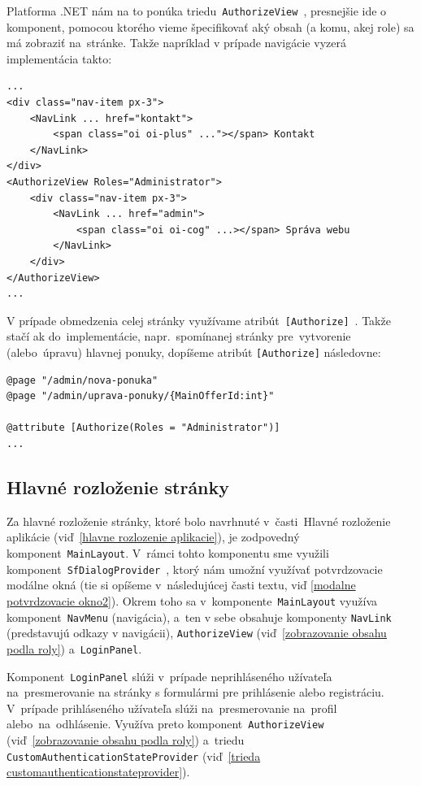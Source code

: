 Platforma .NET nám na to ponúka triedu~\texttt{AuthorizeView}~\cite{authorizeview}, presnejšie ide o komponent, pomocou ktorého vieme špecifikovať aký obsah (a komu, akej role) sa má zobraziť na~stránke. Takže napríklad v prípade navigácie vyzerá implementácia takto:

\begin{verbatim}
...
<div class="nav-item px-3">
    <NavLink ... href="kontakt">
        <span class="oi oi-plus" ..."></span> Kontakt
    </NavLink>
</div>
<AuthorizeView Roles="Administrator">
    <div class="nav-item px-3">
        <NavLink ... href="admin">
            <span class="oi oi-cog" ...></span> Správa webu
        </NavLink>
    </div>
</AuthorizeView>
...
\end{verbatim}

V prípade obmedzenia celej stránky využívame atribút~\texttt{[Authorize]}~\cite{authorize attribute}. Takže stačí ak do~implementácie, napr.~spomínanej stránky pre~vytvorenie (alebo~úpravu) hlavnej ponuky, dopíšeme atribút \verb|[Authorize]| následovne:

\begin{verbatim}
@page "/admin/nova-ponuka"
@page "/admin/uprava-ponuky/{MainOfferId:int}"

@attribute [Authorize(Roles = "Administrator")]
...
\end{verbatim}

\subsection{Hlavné rozloženie stránky}
\label{hlavne rozlozenie stranky}

Za hlavné rozloženie stránky, ktoré bolo navrhnuté v~časti~Hlavné rozloženie aplikácie (viď~\ref{hlavne rozlozenie aplikacie}), je zodpovedný komponent~\verb|MainLayout|. V~rámci tohto komponentu sme využili komponent~\texttt{SfDialogProvider}~\cite{sfdialogprovider}, ktorý nám umožní využívať potvrdzovacie modálne okná (tie si opíšeme v~následujúcej časti textu, viď \ref{modalne potvrdzovacie okno2}). Okrem toho sa v~komponente~\verb|MainLayout| využíva komponent~\verb|NavMenu| (navigácia), a~ten v sebe obsahuje komponenty \verb|NavLink| (predstavujú odkazy v navigácii), \verb|AuthorizeView| (viď~\ref{zobrazovanie obsahu podla roly}) a~\verb|LoginPanel|.

Komponent~\verb|LoginPanel| slúži v~prípade neprihláseného užívateľa na~presmerovanie na stránky s formulármi pre prihlásenie alebo registráciu. V~prípade prihláseného užívateľa slúži na~presmerovanie na~profil alebo~na~odhlásenie. Využíva preto komponent~\verb|AuthorizeView| (viď~\ref{zobrazovanie obsahu podla roly}) a~triedu \verb|CustomAuthenticationStateProvider| (viď~\ref{trieda customauthenticationstateprovider}).

